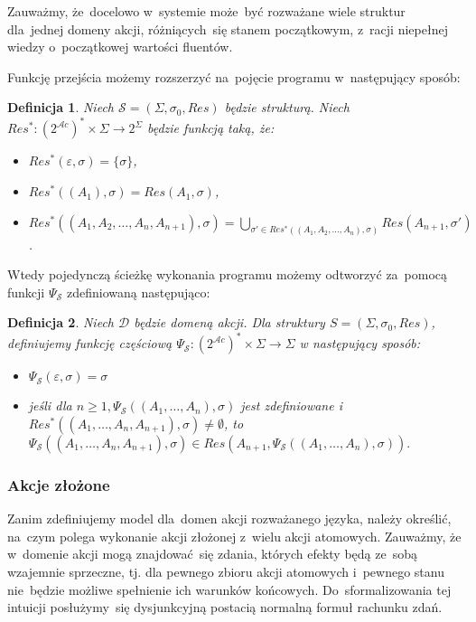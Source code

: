 \documentclass[11pt,a4paper]{article}
\newtheorem{defn}{Definicja}
\begin{document}
Zauważmy, że~docelowo w~systemie może~być rozważane wiele struktur dla~jednej domeny akcji, różniących~się stanem początkowym, z~racji niepełnej wiedzy o~początkowej wartości fluentów.

Funkcję przejścia możemy rozszerzyć na~pojęcie programu w~następujący sposób:

\begin{defn}
    Niech $\mathcal{S} = (\Sigma, \sigma_0, Res)$ będzie strukturą.
    Niech $Res^* : (2^{\mathcal{A}c})^* \times \Sigma \to 2^\Sigma$ będzie funkcją taką, że:
    \begin{itemize}
        \item $Res^*(\varepsilon, \sigma) = \{ \sigma \}$,
        \item $Res^*((A_1), \sigma) = Res(A_1, \sigma)$,
        \item $Res^*((A_1,A_2,\dots,A_n,A_{n+1}), \sigma) = \bigcup_{\sigma' \in Res^*((A_1,A_2,\dots,A_n), \sigma)} Res(A_{n+1}, \sigma')$.
    \end{itemize}
\end{defn}

Wtedy pojedynczą ścieżkę wykonania programu możemy odtworzyć za~pomocą funkcji $\Psi_{\mathcal{S}}$ zdefiniowaną następująco:

\begin{defn}
    Niech $\mathcal{D}$ będzie domeną akcji. Dla struktury $S = (\Sigma,\sigma_0,Res)$, definiujemy funkcję częściową 
    $\Psi_{\mathcal{S}} : (2^{\mathcal{A}c})^* \times \Sigma \rightarrow \Sigma$ w następujący sposób:
    \begin{itemize}
    \item $\Psi_{\mathcal{S}}(\varepsilon,\sigma) = \sigma$
    \item jeśli dla $n \geq 1, \Psi_{\mathcal{S}}((A_1,\dots,A_n),\sigma)$ jest zdefiniowane i $Res^*((A_1,\dots,A_n,A_{n+1}),\sigma) \neq \emptyset$, to~$\Psi_{\mathcal{S}}((A_1,\dots,A_n,A_{n+1}),\sigma) \in Res(A_{n+1},\Psi_{\mathcal{S}}((A_1,\dots,A_n),\sigma)).$
    \end{itemize}
\end{defn}

\subsubsection{Akcje złożone}

Zanim zdefiniujemy model dla~domen akcji rozważanego języka, należy określić, na~czym polega wykonanie akcji złożonej z~wielu akcji atomowych.
Zauważmy, że w~domenie akcji mogą znajdować~się zdania, których efekty będą ze~sobą wzajemnie sprzeczne, tj. dla pewnego zbioru akcji atomowych i~pewnego stanu nie~będzie możliwe spełnienie ich warunków końcowych.
Do~sformalizowania tej intuicji posłużymy~się dysjunkcyjną postacią normalną formuł rachunku zdań.
\end{document}
